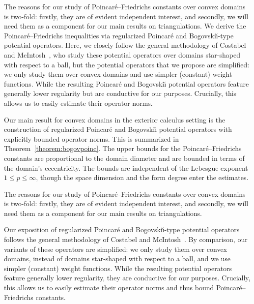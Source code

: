 The reasons for our study of Poincar\'e--Friedrichs constants over convex domains is two-fold: 
firstly, they are of evident independent interest, and secondly, we will need them as a component for our main results on triangulations. 
We derive the Poincar\'e--Friedrichs inequalities via regularized Poincar\'e and Bogovski\u{\i}-type potential operators. 
Here, we closely follow the general methodology of Costabel and McIntosh~\cite{costabel2010bogovskiui},
who study these potential operators over domains star-shaped with respect to a ball,
but the potential operators that we propose are simplified:
we only study them over convex domains and use simpler (constant) weight functions. 
While the resulting Poincar\'e and Bogovski\u{\i} potential operators feature generally lower regularity but are conductive for our purposes. 
Crucially, this allows us to easily estimate their operator norms. 










Our main result for convex domains in the exterior calculus setting is the construction of regularized Poincar\'e and Bogovski\u{\i} potential operators with explicitly bounded operator norms. 
This is summarized in Theorem~\ref{theorem:bogovpoinc}. 
The upper bounds for the Poincar\'e--Friedrichs constants are proportional to the domain diameter and are bounded in terms of the domain's eccentricity. 
The bounds are independent of the Lebesgue exponent $1 \leq p \leq \infty$, though the space dimension and the form degree enter the estimates. 

The reasons for our study of Poincar\'e--Friedrichs constants over convex domains is two-fold: 
firstly, they are of evident independent interest, and secondly, we will need them as a component for our main results on triangulations. 

Our exposition of regularized Poincar\'e and Bogovski\u{\i}-type potential operators follows the general methodology of Costabel and McIntosh~\cite{costabel2010bogovskiui}.
By comparison, our variants of these operators are simplified: 
we only study them over convex domains, instead of domains star-shaped with respect to a ball, 
and we use simpler (constant) weight functions. 
While the resulting potential operators feature generally lower regularity, 
they are conductive for our purposes. 
Crucially, this allows us to easily estimate their operator norms and thus bound Poincar\'e--Friedrichs constants. 


